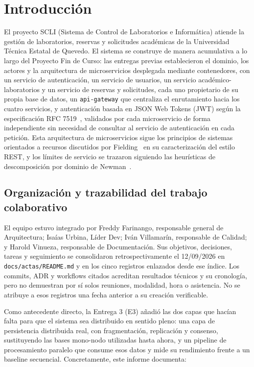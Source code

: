 \documentclass[10pt,twocolumn]{article}
\begin{document}
\vspace{6pt}

\section{Introducción}
\label{sec:intro}

El proyecto SCLI (Sistema de Control de Laboratorios e Informática) atiende
la gestión de laboratorios, reservas y solicitudes académicas de la
Universidad Técnica Estatal de Quevedo. El sistema se construye de manera
acumulativa a lo largo del Proyecto Fin de Curso: las entregas previas
establecieron el dominio, los actores y la arquitectura de microservicios
desplegada mediante contenedores, con un servicio de autenticación, un
servicio de usuarios, un servicio académico-laboratorios y un servicio de
reservas y solicitudes, cada uno propietario de su propia base de datos, un
\texttt{api-gateway} que centraliza el enrutamiento hacia los cuatro
servicios, y autenticación basada en JSON Web Tokens (JWT) según la
especificación RFC 7519~\cite{venckauskas2023jwt}, validados por cada microservicio de
forma independiente sin necesidad de consultar al servicio de
autenticación en cada petición. Esta arquitectura de microservicios sigue
los principios de sistemas orientados a recursos discutidos por
Fielding~\cite{li2021microservices} en su caracterización del estilo REST, y los
límites de servicio se trazaron siguiendo las heurísticas de descomposición
por dominio de Newman~\cite{li2021microservices}.

\subsection{Organización y trazabilidad del trabajo colaborativo}

El equipo estuvo integrado por Freddy Farinango, responsable general de
Arquitectura; Isaías Urbina, Líder Dev; Iván Villamarín, responsable de
Calidad; y Harold Vinueza, responsable de Documentación. Sus objetivos,
decisiones, tareas y seguimiento se consolidaron retrospectivamente el
12/09/2026 en \texttt{docs/actas/README.md} y en los cinco registros enlazados
desde ese índice. Los commits, ADR y workflows citados acreditan resultados
técnicos y su cronología, pero no demuestran por sí solos reuniones, modalidad,
hora o asistencia. No se atribuye a esos registros una fecha anterior a su
creación verificable.

Como antecedente directo, la Entrega 3 (E3) añadió las dos capas que hacían
falta para que el sistema
sea distribuido en sentido pleno: una capa de persistencia distribuida real,
con fragmentación, replicación y consenso, sustituyendo las bases mono-nodo
utilizadas hasta ahora, y un pipeline de procesamiento paralelo que
consume esos datos y mide su rendimiento frente a un baseline secuencial.
Concretamente, este informe documenta:
\end{document}
